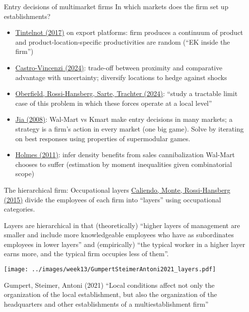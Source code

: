 \documentclass[11pt,notes=hide,aspectratio=169]{beamer}
\begin{document}
\begin{frame}{Entry decisions of multimarket firms}
In which markets does the firm set up establishments?
\begin{itemize}
\item \href{https://doi.org/10.1093/qje/qjw037}{Tintelnot (2017)} on export platforms:
firm produces a continuum of product and product-location-specific productivities are random (``EK inside the firm'')
\item \href{https://www.castrovincenzi.com/}{Castro-Vincenzi (2024)}:
trade-off between proximity and comparative advantage with uncertainty;
diversify locations to hedge against shocks
\item \href{https://doi.org/10.1086/726907}{Oberfield, Rossi-Hansberg, Sarte, Trachter (2024)}:
``study a tractable limit case of this problem in which these forces operate at a local level''%
\item \href{https://doi.org/10.3982/ECTA6649}{Jia (2008)}:
Wal-Mart vs Kmart make entry decisions in many markets; a strategy is a firm's action in every market (one big game).
Solve by iterating on best responses using properties of supermodular games.
\item \href{https://doi.org/10.3982/ECTA7699}{Holmes (2011)}:
infer density benefits from sales cannibalization Wal-Mart chooses to suffer
{\footnotesize (estimation by moment inequalities given combinatorial scope)}
\end{itemize}
\end{frame}
\begin{frame}{The hierarchical firm: Occupational layers}
\href{https://doi.org/10.1086/681641}{Caliendo, Monte, Rossi-Hansberg (2015)}
divide the employees of each firm into ``layers'' using occupational categories.
{\footnotesize Layers are hierarchical in that (theoretically) ``higher layers of management are smaller and include more knowledgeable employees who have as subordinates employees in lower layers'' and (empirically) ``the typical worker in a higher layer earns more, and the typical firm occupies less of them''.\par}
\begin{center}
\texttt{[image: ../images/week13/GumpertSteimerAntoni2021\_layers.pdf]}
\end{center}
{\footnotesize Gumpert, Steimer, Antoni (2021) ``Local conditions affect not only the organization of the local establishment, but also the organization of the headquarters and other establishments of a multiestablishment firm''\par}
\end{frame}
\end{document}

